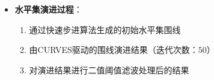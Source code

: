 \begin{frame}
\begin{itemize}
  \item \textbf{水平集演进过程}：
  \begin{enumerate}
     \item 通过快速步进算法生成的初始水平集围线
     \item 由CURVES驱动的围线演进结果（迭代次数：$50$）
     \item 对演进结果进行二值阈值滤波处理后的结果
  \end{enumerate}
\end{itemize}
\begin{columns}[b,onlytextwidth]
\begin{column}{.3\textwidth}
 \begin{figure}
\centering
\setlength{\fboxrule}{0.1pt}
\setlength{\fboxsep}{0cm}
\end{figure}
\end{column}
\begin{column}{.3\textwidth}
 \begin{figure}
\centering
\setlength{\fboxrule}{0.1pt}
\setlength{\fboxsep}{0cm}
\end{figure}
\end{column}
\begin{column}{.3\textwidth}
 \begin{figure}
\centering
\setlength{\fboxrule}{0.1pt}
\setlength{\fboxsep}{0cm}
\end{figure}
\end{column}
\end{columns}
\end{frame} 

